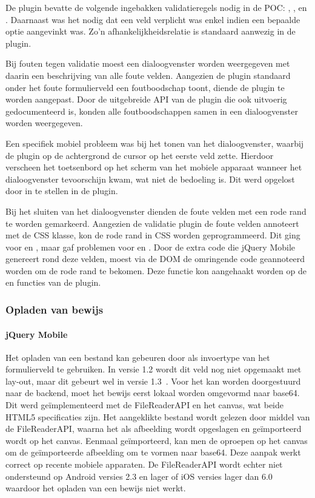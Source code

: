 De plugin bevatte de volgende ingebakken validatieregels nodig in de POC: , ,  en .
Daarnaast was het nodig dat een veld verplicht was enkel indien een bepaalde optie aangevinkt was.
Zo'n afhankelijkheidsrelatie is standaard aanwezig in de plugin.

Bij fouten tegen validatie moest een dialoogvenster worden weergegeven met daarin een beschrijving van alle foute velden.
Aangezien de plugin standaard onder het foute formulierveld een foutboodschap toont, diende de plugin  te worden aangepast.
Door de uitgebreide API van de plugin die ook uitvoerig gedocumenteerd is, konden alle foutboodschappen samen in een dialoogvenster worden weergegeven.

Een specifiek mobiel probleem was bij het tonen van het dialoogvenster, waarbij de plugin op de achtergrond de cursor op het eerste veld zette. 
Hierdoor verscheen het toetsenbord op het scherm van het mobiele apparaat wanneer het dialoogvenster tevoorschijn kwam, wat niet de bedoeling is. 
Dit werd opgelost door  in te stellen in de plugin.

Bij het sluiten van het dialoogvenster dienden de foute velden met een rode rand te worden gemarkeerd.
Aangezien de validatie plugin de foute velden annoteert met de  CSS klasse, kon de rode rand in CSS worden geprogrammeerd. 
Dit ging voor  en , maar gaf problemen voor  en .
Door de extra code die jQuery Mobile genereert rond deze velden, moest via de DOM de omringende code geannoteerd worden om de rode rand te bekomen. 
Deze functie kon aangehaakt worden op de  en  functies van de plugin.

\subsubsection{Opladen van bewijs}

\paragraph{jQuery Mobile} 
Het opladen van een bestand kan gebeuren door  als invoertype van het formulierveld te gebruiken. 
In versie 1.2 wordt dit veld nog niet opgemaakt met lay-out, maar dit gebeurt wel in versie 1.3~\cite{JQuery2013d}. 
Voor het kan worden doorgestuurd naar de backend, moet het bewijs eerst lokaal worden omgevormd naar base64. 
Dit werd geïmplementeerd met de FileReaderAPI en het canvas, wat beide HTML5 specificaties zijn. 
Het aangeklikte bestand wordt gelezen door middel van de FileReaderAPI, waarna het als afbeelding wordt opgeslagen en geïmporteerd wordt op het canvas. 
Eenmaal geïmporteerd, kan men de  oproepen op het canvas om de geïmporteerde afbeelding om te vormen naar base64. 
Deze aanpak werkt correct op recente mobiele apparaten. 
De FileReaderAPI wordt echter niet ondersteund op Android versies 2.3 en lager of iOS versies lager dan 6.0~\cite{Deveria2013a} waardoor het opladen van een bewijs niet werkt.

